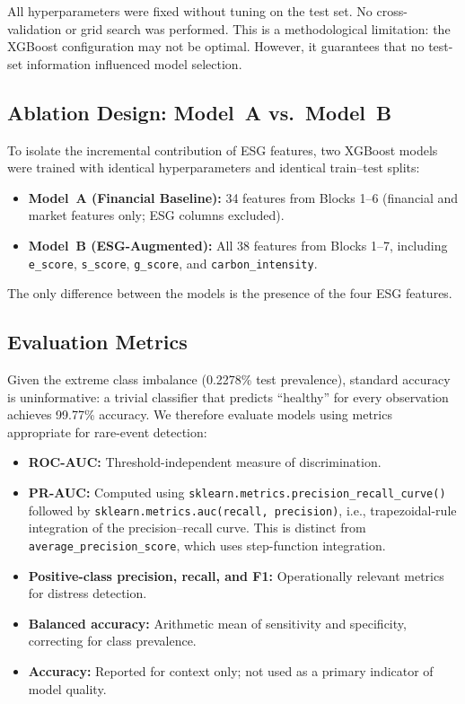 \documentclass[sigconf,anonymous]{acmart}
\begin{document}
All hyperparameters were fixed without tuning on the test set. No cross-validation or grid search was performed. This is a methodological limitation: the XGBoost configuration may not be optimal. However, it guarantees that no test-set information influenced model selection.

\subsection{Ablation Design: Model~A vs.\ Model~B}
To isolate the incremental contribution of ESG features, two XGBoost models were trained with identical hyperparameters and identical train--test splits:
\begin{itemize}
    \item \textbf{Model~A (Financial Baseline):} 34 features from Blocks 1--6 (financial and market features only; ESG columns excluded).
    \item \textbf{Model~B (ESG-Augmented):} All 38 features from Blocks 1--7, including \texttt{e\_score}, \texttt{s\_score}, \texttt{g\_score}, and \texttt{carbon\_intensity}.
\end{itemize}
The only difference between the models is the presence of the four ESG features.

\subsection{Evaluation Metrics}
Given the extreme class imbalance (0.2278\% test prevalence), standard accuracy is uninformative: a trivial classifier that predicts ``healthy'' for every observation achieves 99.77\% accuracy. We therefore evaluate models using metrics appropriate for rare-event detection:
\begin{itemize}
    \item \textbf{ROC-AUC:} Threshold-independent measure of discrimination.
    \item \textbf{PR-AUC:} Computed using \texttt{sklearn.metrics.precision\_recall\_curve()} followed by \texttt{sklearn.metrics.auc(recall, precision)}, i.e., trapezoidal-rule integration of the precision--recall curve. This is distinct from \texttt{average\_precision\_score}, which uses step-function integration.
    \item \textbf{Positive-class precision, recall, and F1:} Operationally relevant metrics for distress detection.
    \item \textbf{Balanced accuracy:} Arithmetic mean of sensitivity and specificity, correcting for class prevalence.
    \item \textbf{Accuracy:} Reported for context only; not used as a primary indicator of model quality.
\end{itemize}
\end{document}
